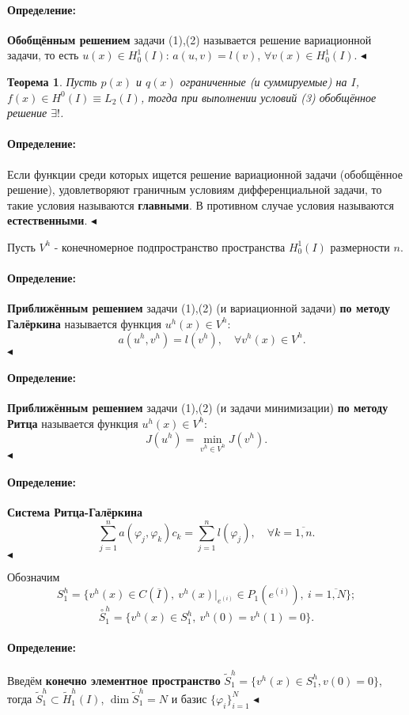 \documentclass{article}
\newtheorem{theorem}{Теорема}
\newenvironment{definition}{ \paragraph{Определение:}}{\hfill $\blacktriangleleft$}
\begin{document}
\begin{definition}
	\textbf{Обобщённым решением} задачи (1),(2) называется решение вариационной задачи, то есть $u(x) \in H_0^1(I)$: $a(u,v) = l(v)$, $\forall v(x) \in H_0^1(I)$.
\end{definition}

\begin{theorem}
	Пусть $p(x)$ и $q(x)$ ограниченные (и суммируемые) на $I$, $f(x) \in H^0(I) \equiv L_2(I)$, тогда при выполнении условий (3) обобщённое решение $\exists !$.
\end{theorem}

\begin{definition}
	Если функции среди которых ищется решение вариационной задачи (обобщённое решение), удовлетворяют граничным условиям дифференциальной задачи, то такие условия называются \textbf{главными}. В противном случае условия называются \textbf{естественными}.
\end{definition}

\bigskip

Пусть $V^h$ - конечномерное подпространство пространства $H_0^1(I)$ размерности $n$. 

\begin{definition}
	\textbf{Приближённым решением} задачи (1),(2) (и вариационной задачи) \textbf{по методу Галёркина} называется функция $u^h(x) \in V^h$:
	\[
	 \quad a(u^h, v^h) = l(v^h), \quad \forall v^h(x) \in V^h.
	\]
\end{definition}

\begin{definition}
	\textbf{Приближённым решением} задачи (1),(2) (и задачи минимизации) \textbf{по методу Ритца} называется функция $u^h(x) \in V^h$:
	\[
	J(u^h) = \min\limits_{v^h \in V^h} J(v^h).
	\]
\end{definition}

\begin{definition}
	\textbf{Система Ритца-Галёркина}
	\[
	\sum_{j = 1}^n a(\varphi_j, \varphi_k) c_k = \sum_{j = 1}^n l(\varphi_j),  \quad  \forall k = \overline{1,n}.
	\]
\end{definition}

Обозначим
\[
	S_1^h = \{ v^h(x) \in C(\overline{I}), \ v^h(x)\big|_{e^{(i)}} \in P_1(e^{(i)}), \ i = \overline{1,N} \};
\]
\[
	\overset{\circ}{S}_1^h = \{ v^h(x) \in S_1^h, \ v^h(0) = v^h(1) = 0 \}.
\]


\begin{definition}
	Введём \textbf{конечно элементное пространство} $\tilde{S}_1^h = \{ v^h(x) \in S_1^h, v(0) = 0 \}$, тогда $\tilde{S}_1^h \subset \tilde{H}_1^h(I)$, $\dim \tilde{S}_1^h = N$ и базис $\{ \varphi_i \}_{i = 1}^N$
\end{definition}
\end{document}
